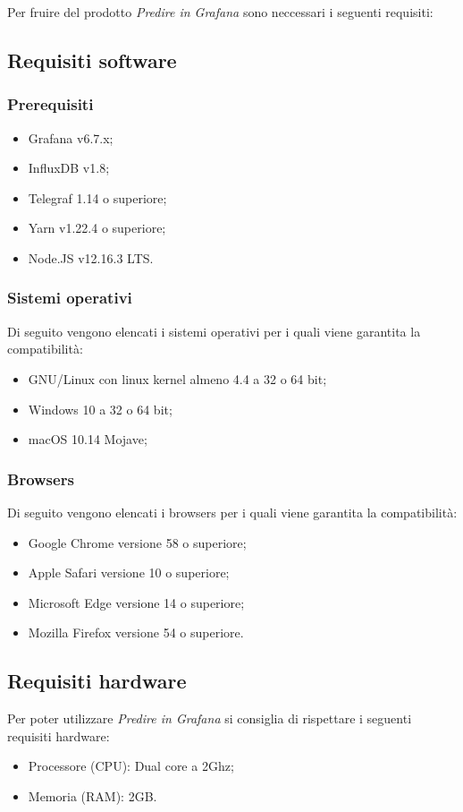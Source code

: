 \documentclass[../manuale-utente.tex]{subfiles}
\begin{document}
Per fruire del prodotto \textit{Predire in Grafana} sono neccessari i seguenti requisiti:

\subsection{Requisiti software}%
\label{subs:requisiti_softwaree}

\subsubsection{Prerequisiti}%
\label{sssec:prerequisiti}

\begin{itemize}
  \item Grafana v6.7.x;
  \item InfluxDB v1.8;
  \item Telegraf 1.14 o superiore;
  \item Yarn v1.22.4 o superiore;
  \item Node.JS v12.16.3 LTS.
\end{itemize}

\subsubsection{Sistemi operativi}%
\label{sssec:sistemi_operativi}
Di seguito vengono elencati i sistemi operativi per i quali viene garantita la compatibilità:
\begin{itemize}
  \item GNU/Linux con linux kernel almeno 4.4 a 32 o 64 bit;
  \item Windows 10 a 32 o 64 bit;
  \item macOS 10.14 Mojave;
\end{itemize}

\subsubsection{Browsers}%
\label{sssub:browsers}
Di seguito vengono elencati i browsers per i quali viene garantita la compatibilità:
\begin{itemize}
  \item Google Chrome versione 58 o superiore;
  \item Apple Safari versione 10 o superiore;
  \item Microsoft Edge versione 14 o superiore;
  \item Mozilla Firefox versione 54 o superiore.
\end{itemize}

\subsection{Requisiti hardware}%
\label{subs:requisiti_hardware}

Per poter utilizzare \textit{Predire in Grafana} si consiglia di rispettare i seguenti requisiti hardware:

\begin{itemize}
  \item Processore (CPU): Dual core a 2Ghz;
  \item Memoria (RAM): 2GB.
\end{itemize}
\end{document}

